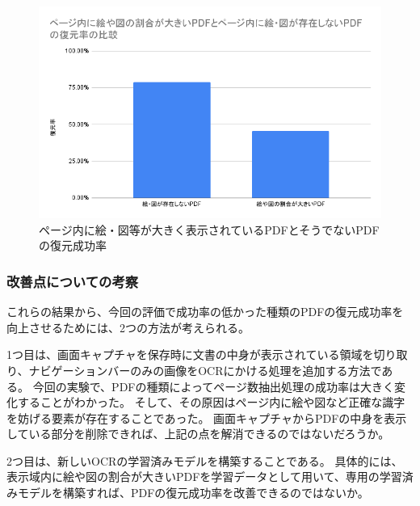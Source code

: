 \begin{figure}[htbp]
  \label{fig:success-rate-figure-or-not-pdf}
  \begin{center}
    \includegraphics[bb=0 0 702 434,width=15cm]{img/060_evaluation/consideration/pdf/success-rate-figure-or-not-pdf.pdf}
  \end{center}
  \caption{ページ内に絵・図等が大きく表示されているPDFとそうでないPDFの復元成功率}
\end{figure}

\subsubsection{改善点についての考察}
これらの結果から、今回の評価で成功率の低かった種類のPDFの復元成功率を向上させるためには、2つの方法が考えられる。

1つ目は、画面キャプチャを保存時に文書の中身が表示されている領域を切り取り、ナビゲーションバーのみの画像をOCRにかける処理を追加する方法である。
今回の実験で、PDFの種類によってページ数抽出処理の成功率は大きく変化することがわかった。
そして、その原因はページ内に絵や図など正確な識字を妨げる要素が存在することであった。
画面キャプチャからPDFの中身を表示している部分を削除できれば、上記の点を解消できるのではないだろうか。

2つ目は、新しいOCRの学習済みモデルを構築することである。
具体的には、表示域内に絵や図の割合が大きいPDFを学習データとして用いて、専用の学習済みモデルを構築すれば、PDFの復元成功率を改善できるのではないか。
